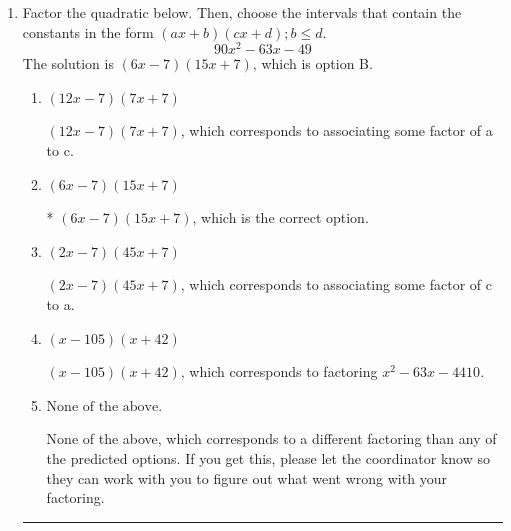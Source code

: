 \documentclass{extbook}[14pt]
\newcommand{\litem}[1]{\item #1

\rule{\textwidth}{0.4pt}}
\begin{document}
\begin{enumerate}
{\begin{enumerate}[label=\Alph*.]
 $x_1 = 0.900 \text{ and } x_2 = 6.000$, which corresponds to solving the factored version $(10x -9)(x -6)$.
\item \( x_1 = 1.200 \text{ and } x_2 = 4.500 \)

* $x_1 = 1.200 \text{ and } x_2 = 4.500$, which is the correct option. Obtained by solving the factored version $(5x -6)(2x -9)$.
\item \( x_1 = 12.000 \text{ and } x_2 = 45.000 \)

 $x_1 = 12.000 \text{ and } x_2 = 45.000$, which corresponds to solving the factored version $(x -12)(x -45)$.
\item \( x_1 = 0.400 \text{ and } x_2 = 13.500 \)

 $x_1 = 0.400 \text{ and } x_2 = 13.500$, which corresponds to solving the factored version $(5x -2)(2x -27)$.
\item \( x_1 = 1.500 \text{ and } x_2 = 3.600 \)

 $x_1 = 1.500 \text{ and } x_2 = 3.600$, which corresponds to solving the factored version $(2x -3)(5x -18)$.
\end{enumerate}

\textbf{General Comment:} This question can be factored, but it may be faster to find the solutions via the Quadratic Equation.
}
\litem{
Factor the quadratic below. Then, choose the intervals that contain the constants in the form $(ax+b)(cx+d); b \leq d.$
\[ 90x^{2} -63 x -49 \]The solution is \( (6x -7)(15x + 7) \), which is option B.\begin{enumerate}[label=\Alph*.]
\item \( (12x -7)(7x + 7) \)

 $(12x -7)(7x + 7)$, which corresponds to associating some factor of a to c.
\item \( (6x -7)(15x + 7) \)

* $(6x -7)(15x + 7)$, which is the correct option.
\item \( (2x -7)(45x + 7) \)

 $(2x -7)(45x + 7)$, which corresponds to associating some factor of c to a.
\item \( (x -105)(x + 42) \)

 $(x -105)(x + 42)$, which corresponds to factoring $x^{2} -63 x -4410$.
\item \( \text{None of the above.} \)

 None of the above, which corresponds to a different factoring than any of the predicted options. If you get this, please let the coordinator know so they can work with you to figure out what went wrong with your factoring.
\end{enumerate}

}
\end{enumerate}
\end{document}
